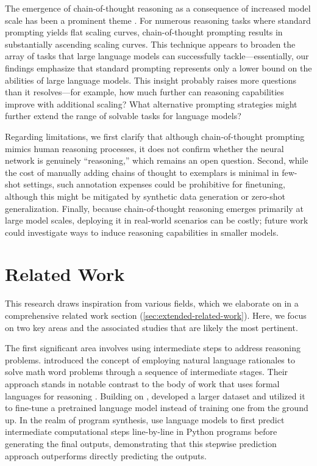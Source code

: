 The emergence of chain-of-thought reasoning as a consequence of increased model scale has been a prominent theme \citep{wei2022emergent}. For numerous reasoning tasks where standard prompting yields flat scaling curves, chain-of-thought prompting results in substantially ascending scaling curves. This technique appears to broaden the array of tasks that large language models can successfully tackle—essentially, our findings emphasize that standard prompting represents only a lower bound on the abilities of large language models. This insight probably raises more questions than it resolves—for example, how much further can reasoning capabilities improve with additional scaling? What alternative prompting strategies might further extend the range of solvable tasks for language models?

Regarding limitations, we first clarify that although chain-of-thought prompting mimics human reasoning processes, it does not confirm whether the neural network is genuinely “reasoning,” which remains an open question. Second, while the cost of manually adding chains of thought to exemplars is minimal in few-shot settings, such annotation expenses could be prohibitive for finetuning, although this might be mitigated by synthetic data generation or zero-shot generalization.  Finally, because chain-of-thought reasoning emerges primarily at large model scales, deploying it in real-world scenarios can be costly; future work could investigate ways to induce reasoning capabilities in smaller models.

\section{Related Work} This research draws inspiration from various fields, which we elaborate on in a comprehensive related work section (\cref{sec:extended-related-work}). Here, we focus on two key areas and the associated studies that are likely the most pertinent.

The first significant area involves using intermediate steps to address reasoning problems. \cite{ling-etal-2017-program} introduced the concept of employing natural language rationales to solve math word problems through a sequence of intermediate stages. Their approach stands in notable contrast to the body of work that uses formal languages for reasoning \citep{roy-2016-reasoning, chiang-chen-2019-semantically, amini-etal-2019-mathqa, chen2019neural}. Building on \cite{ling-etal-2017-program}, \citet{cobbe2021training} developed a larger dataset and utilized it to fine-tune a pretrained language model instead of training one from the ground up. In the realm of program synthesis, \cite{nye2021show} use language models to first predict intermediate computational steps line-by-line in Python programs before generating the final outputs, demonstrating that this stepwise prediction approach outperforms directly predicting the outputs.


